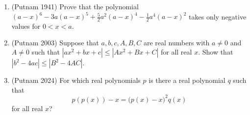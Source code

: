 \documentclass[11pt,a4paper]{article}
\renewcommand{\le}{\leqslant}
\begin{document}
\begin{enumerate}[leftmargin=2.2em,itemsep=0.6em]
\item (Putnam 1941) Prove that the polynomial
$(a-x)^6-3a(a-x)^5+\frac52a^2(a-x)^4-\frac12a^4(a-x)^2$ takes only negative values for
$0<x<a$.

\item (Putnam 2003) Suppose that $a,b,c,A,B,C$ are real numbers with $a\ne0$ and $A\ne0$ such
that $|ax^2+bx+c|\le|Ax^2+Bx+C|$ for all real $x$. Show that $|b^2-4ac|\le|B^2-4AC|$.

\item (Putnam 2024) For which real polynomials $p$ is there a real polynomial $q$ such that
\[
p(p(x))-x=\bigl(p(x)-x\bigr)^2q(x)
\]
for all real $x$?
\end{enumerate}
\end{document}
